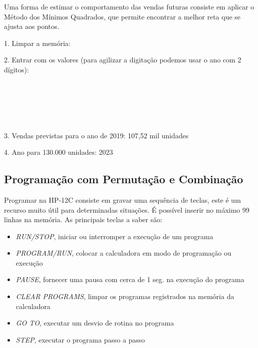 Uma forma de estimar o comportamento das vendas futuras consiste em aplicar o Método dos Mínimos Quadrados, que permite encontrar a melhor reta que se ajusta aos pontos.

1. Limpar a memória: \\
 \keystroke{$\sum$}

2. Entrar com os valores (para agilizar a digitação podemos usar o ano com 2 dígitos): \\
     \keystroke{$\sum+$} \\
     \keystroke{$\sum+$} \\
     \keystroke{$\sum+$} \\
     \keystroke{$\sum+$} \\
     \keystroke{$\sum+$} \\
     \keystroke{$\sum+$} 

3. Vendas previstas para o ano de 2019: 107,52 mil unidades \\ 
   

4. Ano para 130.000 unidades: 2023 \\
    

\subsection*{Programação com Permutação e Combinação}
Programar na HP-12C consiste em gravar uma sequência de teclas, este é um recurso muito útil para determinadas situações. É possível inserir no máximo 99 linhas na memória. As principais teclas a saber são: \vspace{-1em}
\begin{itemize}
	\item {} \textit{RUN/STOP}, iniciar ou interromper a execução de um programa
	\item {}  \textit{PROGRAM/RUN}, colocar a calculadora em modo de programação ou execução
	\item {}  \textit{PAUSE}, fornecer uma pausa com cerca de 1 seg. na execução do programa
	\item {}  \textit{CLEAR PROGRAMS}, limpar os programas registrados na memória da calculadora
	\item {}  \textit{GO TO}, executar um desvio de rotina no programa
	\item {}  \textit{STEP}, executar o programa passo a passo
\end{itemize}

